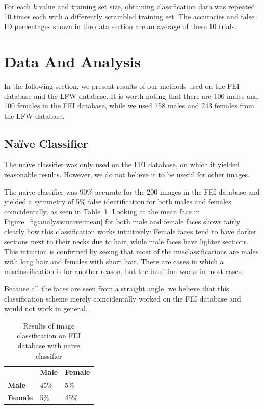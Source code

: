\documentclass[hidelinks,11pt]{article}
\begin{document}
For each $k$ value and training set size, obtaining classification data was
repeated 10 times each with a differently scrambled training set. The accuracies
and false ID percentages shown in the data section are an average of these 10
trials.

\pagebreak
\section{Data And Analysis}
\label{sec:analysis}

In the following section, we present results of our methods used on the FEI
database and the LFW database. It is worth noting that there are 100 males and
100 females in the FEI database, while we used 758 males and 243 females from
the LFW database.

\subsection{Na\"ive Classifier}
\label{sec:analysis:naive}

The na\"ive classifier was only used on the FEI database, on which it yielded
reasonable results. However, we do not believe it to be useful for other images.

The na\"ive classifier was 90\% accurate for the 200 images in the FEI database
and yielded a symmetry of 5\% false identification for both males and females
coincidentally, as seen in Table~\ref{tab:analysis:naive:data}. Looking at the
mean face in Figure~\ref{fig:analysis:naive:mean} for both
male and female faces shows fairly clearly how this classification works
intuitively: Female faces tend to have darker sections next to their necks due to
hair, while male faces have lighter sections. This intuition is confirmed by
seeing that most of the misclassifications are males with long hair and females
with short hair. There are cases in which a misclassification is for another
reason, but the intuition works in most cases.

Because all the faces are seen from a straight angle, we believe that this
classification scheme merely coincidentally worked on the FEI database and would
not work in general.

\begin{table}[!ht]
  \vspace{20pt}
  \centering
  \begin{tabular}{lll}
    \toprule
                      & \bfseries Male  & \bfseries Female  \\
    \bfseries Male    & 45\%            & 5\%               \\
    \bfseries Female  & 5\%             & 45\%              \\
    \bottomrule
  \end{tabular}
  \caption{Results of image classification on FEI database with na\"ive
  classifier}
  \label{tab:analysis:naive:data}
  \vspace{20pt}
\end{table}
\end{document}
